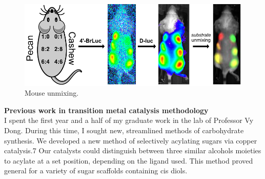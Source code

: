 \documentclass[11pt]{article}
\begin{document}
\begin{figure}
\vspace{-0.2in}
\begin{centering}
\includegraphics[width=\textwidth]{figures/mouse_unmixing.pdf}

\end{centering}
\footnotesize
\caption{\label{figure:mouse_unmixing}
Mouse unmixing.
}
\end{figure}

\textbf{Previous work in transition metal catalysis methodology}\\
I spent the first year and a half of my graduate work in the lab of Professor Vy Dong. During this time, I sought new, streamlined methods of carbohydrate synthesis. We developed a new method of selectively acylating sugars via copper catalysis.7 Our catalysts could distinguish between three similar alcohols moieties to acylate at a set position, depending on the ligand used. This method proved general for a variety of sugar scaffolds containing cis diols.


\eject

%
%

\eject
\end{document}
